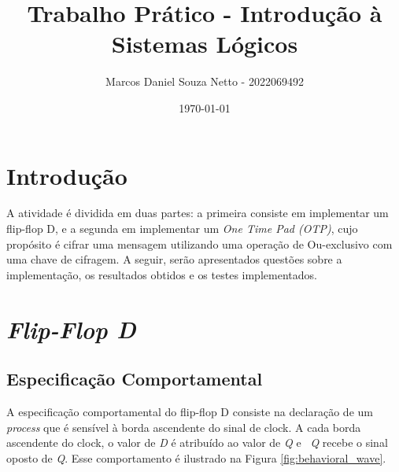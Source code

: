 \documentclass{article}
\title{Trabalho Prático - Introdução à Sistemas Lógicos}
\author{Marcos Daniel Souza Netto - 2022069492}
\date{\today}
\begin{document}
\maketitle

\section{Introdução}

A atividade é dividida em duas partes: a primeira consiste em implementar um flip-flop D, e a segunda em implementar um \emph{One Time Pad (OTP)}, cujo propósito é cifrar uma mensagem utilizando uma operação de Ou-exclusivo com uma chave de cifragem. A seguir, serão apresentados questões sobre a implementação, os resultados obtidos e os testes implementados.

\section{\emph{Flip-Flop D}}
\subsection{Especificação Comportamental}

A especificação comportamental do flip-flop D consiste na declaração de um \emph{process} que é sensível à borda ascendente do sinal de clock. 
A cada borda ascendente do clock, o valor de \emph{D} é atribuído ao valor de \emph{Q} e \emph{~Q} recebe o sinal oposto de \emph{Q}. Esse comportamento é ilustrado na Figura \ref{fig:behavioral_wave}.
\end{document}
